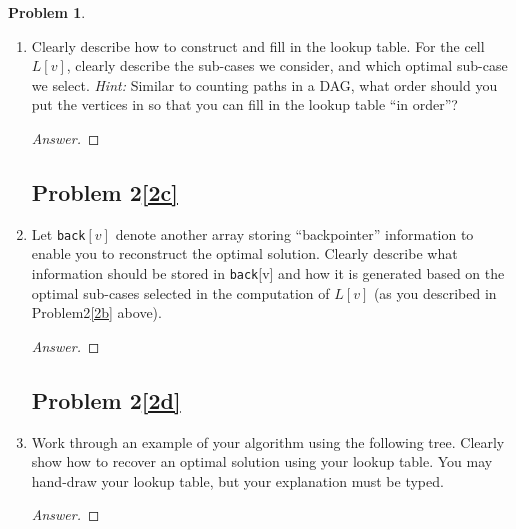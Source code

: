\documentclass[11pt]{article}
\theoremstyle{definition}
\theoremstyle{definition}
\newtheorem{required}{Problem}
\theoremstyle{definition}
\begin{document}
\begin{required}
\begin{enumerate}[label=(\alph*)]
\newpage
\subsection{Problem 2\ref{2b}}
\item \label{2b} Clearly describe how to construct and fill in the lookup table. For the cell $L[v]$, clearly describe the sub-cases we consider, and which optimal sub-case we select. \emph{Hint:} Similar to counting paths in a DAG, what order should you put the vertices in so that you can fill in the lookup table ``in order''?

\begin{proof}[Answer]
\end{proof}

\newpage
\subsection{Problem 2\ref{2c}}
\item \label{2c} Let \texttt{back}$[v]$ denote another array storing ``backpointer'' information to enable you to reconstruct the optimal solution. Clearly describe what information should be stored in \texttt{back}[v] and how it is generated based on the optimal sub-cases selected in the computation of $L[v]$ (as you described in Problem2\ref{2b} above).


\begin{proof}[Answer]
\end{proof}

\newpage
\subsection{Problem 2\ref{2d}}
\item \label{2d} Work through an example of your algorithm using the following tree. Clearly show how to recover an optimal solution using your lookup table. You may hand-draw your lookup table, but your explanation must be typed.



\begin{proof}[Answer]
\end{proof}

\end{enumerate}



\end{required}
\end{document}
